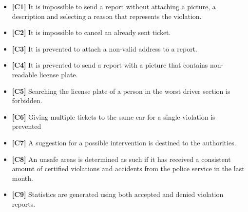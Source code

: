 \begin{itemize}
		\item \textbf{[\hypertarget{C1}{C1}]} It is impossible to send a report without attaching a picture, a description and selecting a reason that represents the violation. 
		\item \textbf{[\hypertarget{C2}{C2}]} It is impossible to cancel an already sent ticket. 
		\item \textbf{[\hypertarget{C3}{C3}]} It is prevented to attach a non-valid address to a report.
		\item \textbf{[\hypertarget{C4}{C4}]} It is prevented to send a report with a picture that contains non-readable license plate. 
		\item \textbf{[\hypertarget{C5}{C5}]} Searching the license plate of a person in the worst driver section is forbidden.
		\item \textbf{[\hypertarget{C6}{C6}]} Giving multiple tickets to the same car for a single violation is prevented
		\item \textbf{[\hypertarget{C7}{C7}]} A suggestion for a possible intervention is destined to the authorities.
		\item \textbf{[\hypertarget{C8}{C8}]} An unsafe areas is determined as such if it has received a consistent amount of certified violations and accidents from the police service in the last month. 
		\item \textbf{[\hypertarget{C9}{C9}]} Statistics are generated using both accepted and denied violation reports.
		
	\end{itemize}
\clearpage
